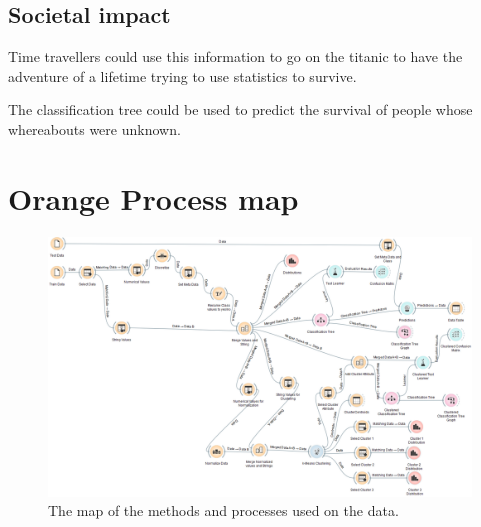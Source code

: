 \documentclass[a4paper,11pt]{article}
\begin{document}
\subsection{Societal impact}
Time travellers could use this information to go on the titanic to have the adventure of a lifetime trying to use statistics to survive.

The classification tree could be used to predict the survival of people whose whereabouts were unknown.

\clearpage
\appendix
\section{Orange Process map}
\begin{figure}[h]
	\centering
	\includegraphics[scale=0.35]{orangeMap}
	\caption{The map of the methods and processes used on the data.}
	\label{OrangeMap}
\end{figure}
\end{document}
